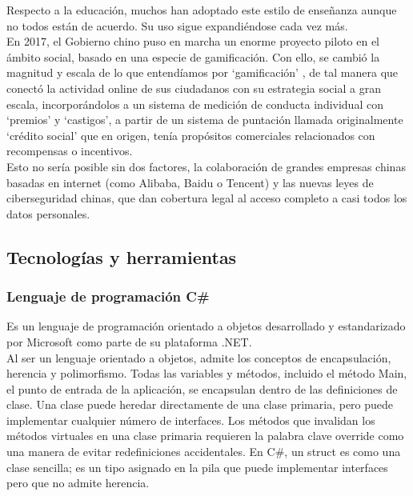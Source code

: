 \quad Respecto a la educación, muchos han adoptado este estilo de enseñanza aunque no todos están de acuerdo. Su uso sigue expandiéndose cada vez más.\\

\quad En 2017, el Gobierno chino puso en marcha un enorme proyecto piloto en el ámbito social, basado en una especie de gamificación. Con ello, se cambió la magnitud y escala de lo que entendíamos por ‘gamificación’ , de tal manera que conectó la actividad online de sus ciudadanos con su estrategia social a gran escala, incorporándolos a un sistema de medición de conducta individual con ‘premios’ y ‘castigos’, a partir de un sistema de puntación llamada originalmente ‘crédito social’ que en origen, tenía propósitos comerciales relacionados con recompensas o incentivos.\\

\quad Esto no sería posible sin dos factores, la colaboración de grandes empresas chinas basadas en internet (como Alibaba, Baidu o Tencent) y las nuevas leyes de ciberseguridad chinas, que dan cobertura legal al acceso completo a casi todos los datos personales.\\

\subsection{Tecnologías y herramientas}

	\subsubsection{Lenguaje de programación C\#}

\quad Es un lenguaje de programación orientado a objetos desarrollado y estandarizado por Microsoft como parte de su plataforma .NET.\\

\quad Al ser un lenguaje orientado a objetos, admite los conceptos de encapsulación, herencia y polimorfismo. Todas las variables y métodos, incluido el método Main, el punto de entrada de la aplicación, se encapsulan dentro de las definiciones de clase. Una clase puede heredar directamente de una clase primaria, pero puede implementar cualquier número de interfaces. Los métodos que invalidan los métodos virtuales en una clase primaria requieren la palabra clave override como una manera de evitar redefiniciones accidentales. En C\#, un struct es como una clase sencilla; es un tipo asignado en la pila que puede implementar interfaces pero que no admite herencia.\\

